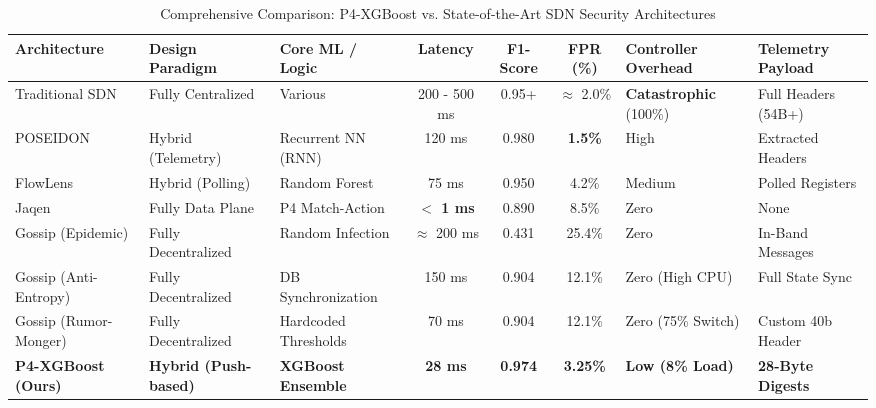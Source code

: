 \documentclass[sigconf, nonacm]{acmart}
\begin{document}
\begin{table}[t]
\centering
\caption{Comprehensive Comparison: P4-XGBoost vs. State-of-the-Art SDN Security Architectures}
\label{tab:massive_comparison}
\renewcommand{\arraystretch}{1.3}
\setlength{\tabcolsep}{4.5pt} 
\small 

\begin{tabularx}{\textwidth}{|X|X|l|c|c|c|l|l|}
\hline
\textbf{Architecture} & \textbf{Design Paradigm} & \textbf{Core ML / Logic} & \textbf{Latency} & \textbf{F1-Score} & \textbf{FPR (\%)} & \textbf{Controller Overhead} & \textbf{Telemetry Payload} \\
\hline
Traditional SDN & Fully Centralized & Various & 200 - 500 ms & 0.95+ & $\approx$ 2.0\% & \textbf{Catastrophic} (100\%) & Full Headers (54B+) \\ \hline
POSEIDON \cite{poseidon} & Hybrid (Telemetry) & Recurrent NN (RNN) & 120 ms & 0.980 & \textbf{1.5\%} & High & Extracted Headers \\ \hline
FlowLens \cite{flowlens} & Hybrid (Polling) & Random Forest & 75 ms & 0.950 & 4.2\% & Medium & Polled Registers \\ \hline
Jaqen \cite{jaqen} & Fully Data Plane & P4 Match-Action & \textbf{$<$ 1 ms} & 0.890 & 8.5\% & Zero & None \\ \hline
Gossip (Epidemic) \cite{smriti2023} & Fully Decentralized & Random Infection & $\approx$ 200 ms & 0.431 & 25.4\% & Zero & In-Band Messages \\ \hline
Gossip (Anti-Entropy) \cite{smriti2026} & Fully Decentralized & DB Synchronization & 150 ms & 0.904 & 12.1\% & Zero (High CPU) & Full State Sync \\ \hline
Gossip (Rumor-Monger) \cite{smriti2026} & Fully Decentralized & Hardcoded Thresholds & 70 ms & 0.904 & 12.1\% & Zero (75\% Switch) & Custom 40b Header \\ \hline
\hline
\textbf{P4-XGBoost (Ours)} & \textbf{Hybrid (Push-based)} & \textbf{XGBoost Ensemble} & \textbf{28 ms} & \textbf{0.974} & \textbf{3.25\%} & \textbf{Low (8\% Load)} & \textbf{28-Byte Digests} \\
\hline
\end{tabularx}
\end{table}
\end{document}
